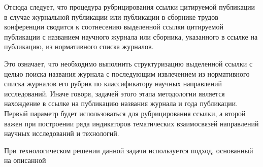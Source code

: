 \begin{multicols}{2}
      Отсюда следует, что процедура рубрицирования ссылки цитируемой публикации в 
случае журнальной публикации или публикации в сборнике трудов конференции сводится к 
соотнесению выделенной ссылки цитируемой публикации с названием научного журнала или 
сборника, указанного в ссылке на публикацию, из нормативного списка журналов.
      
      Это означает, что необходимо выполнить структуризацию выделенной ссылки с целью 
поиска названия журнала с последующим извлечением из нормативного списка журналов его 
рубрик по классификатору научных направлений исследований. Иначе говоря, задачей этого 
этапа методологии является нахождение в ссылке на публикацию названия журнала и года 
публикации. Первый параметр будет использоваться для рубрицирования ссылки, а второй 
важен при построении ряда индикаторов тематических взаимосвязей направлений научных 
исследований и технологий.
      
      При технологическом решении данной задачи используется подход, основанный на 
описанной\linebreak\vspace*{-12pt}

\pagebreak

\end{multicols}

\begin{figure} %
         \vspace*{1pt}
 \begin{center}
 \mbox{%
 \epsfxsize=144.222mm
 }
 \end{center}
 \vspace*{-6pt}
\vspace*{6pt}
      \end{figure}

